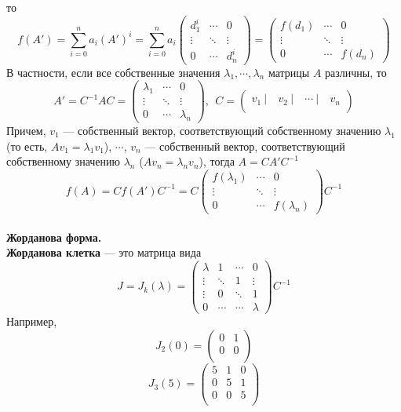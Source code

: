\documentclass[12pt]{article}
\theoremstyle{definition}
\numberwithin{equation}{section}
\begin{document}
	то \[f(A')=\sum\limits_{i=0}^n a_i(A')^i=\sum\limits_{i=0}^n a_i\begin{pmatrix}
	d_1^i & \cdots & 0\\
	\vdots & \ddots & \vdots\\
	0 & \cdots & d_n^i
	\end{pmatrix}=\begin{pmatrix}
	f(d_1) & \cdots & 0\\
	\vdots & \ddots & \vdots\\
	0 & \cdots & f(d_n)
	\end{pmatrix}\]
	В частности, если все собственные значения $\lambda_1,\cdots, \lambda_n$ матрицы $A$ различны, то 
	\[A'=C^{-1}AC=\begin{pmatrix}
	\lambda_1 & \cdots & 0\\
	\vdots & \ddots & \vdots\\
	0 & \cdots & \lambda_n
	\end{pmatrix},~~C= \begin{pmatrix}
	v_1~| & ~v_2~| & ~\cdots~| & ~v_n\\
	\end{pmatrix}\]
	Причем, $v_1$ --- собственный вектор, соответствующий собственному значению $\lambda_1$ (то есть, $Av_1=\lambda_1 v_1$), $\cdots$, $v_n$ --- собственный вектор, соответствующий собственному значению $\lambda_n$ ($Av_n=\lambda_n v_n$), тогда $A=CA'C^{-1}$
	\[f(A)=Cf(A')C^{-1}=C\begin{pmatrix}
	f(\lambda_1) & \cdots & 0\\
	\vdots & \ddots & \vdots\\
	0 & \cdots & f(\lambda_n)
	\end{pmatrix}C^{-1}\]
	\\
	\textbf{Жорданова форма.}\\
	\textbf{Жорданова клетка} --- это матрица вида
	\[J=J_k(\lambda)=\begin{pmatrix}
	\lambda &  1 & \cdots & 0\\
	\vdots & \ddots & 1 & \vdots\\
	\vdots & 0 & \ddots & 1\\
	0 & \cdots & \cdots & \lambda
	\end{pmatrix}C^{-1}\]
	Например, 
	\[J_2(0) = \begin{pmatrix}
	0 & 1\\
	0 & 0\\
	\end{pmatrix}\]
	\[J_3(5) = \begin{pmatrix}
	5 & 1 & 0\\
	0 & 5 & 1\\
	0 & 0 & 5\\
	\end{pmatrix}\]
\end{document}
